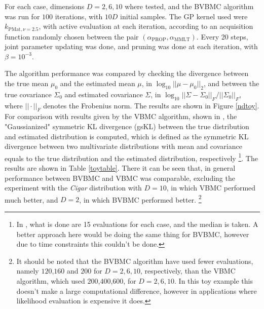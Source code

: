 For each case, dimensions $D = 2,6,10$ where tested, and the BVBMC algorithm was run for $100$ iterations, with $10D$ initial samples. The GP kernel used were $k_{\text{PMat},\nu=2.5}$, with active evaluation at each iteration, according to an acquisition function randomly chosen between the pair $(\alpha_\text{PROP},\alpha_\text{MMLT})$. Every 20 steps, joint parameter updating was done, and pruning was done at each iteration, with $\beta = 10^{-3}$.

The algorithm performance was compared by checking the divergence between the true mean $\mu_0$ and the estimated mean $\mu$, in $\log_{10}||\mu - \mu_0||_2$, and between the true covariance $\Sigma_0$ and estimated covariance $\Sigma$, in $\log_{10}||\Sigma - \Sigma_0||_F/||\Sigma_0||_F$, where $||\cdot||_F$ denotes the Frobenius norm. The results are shown in Figure \ref{ndtoy}. For comparison with results given by the VBMC algorithm, shown in \cite{Acerbi_2018}, the "Gaussianized" symmetric KL divergence (gsKL) between the true distribution and estimated distribution is computed, which is defined as the symmetric KL divergence between two multivariate distributions with mean and covariance equals to the true distribution and the estimated distribution, respectively \footnote{In \cite{Acerbi_2018}, what is done are 15 evaluations for each case, and the median is taken. A better approach here would be doing the same thing for BVBMC, however due to time constraints this couldn't be done.}. The results are shown in Table \ref{toytable}. There it can be seen that, in general performance between BVBMC and VBMC was comparable, excluding the experiment with the \textit{Cigar} distribution with $D=10$, in which VBMC performed much better, and $D=2$, in which BVBMC performed better. \footnote{It should be noted that the BVBMC algorithm have used fewer evaluations, namely $120$,$160$ and $200$ for $D=2,6,10$, respectively, than the VBMC algorithm, which used $200$,$400$,$600$, for $D=2,6,10$. In this toy example this doesn't make a large computational difference, however in applications where likelihood evaluation is expensive it does.}

